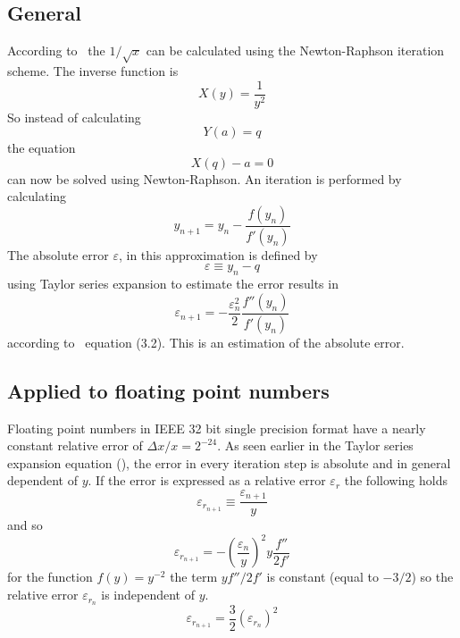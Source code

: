 \subsection{General}
According to~\cite{Bekker87} the $1/\sqrt{x}$ can be calculated using
the Newton-Raphson iteration scheme. The inverse function is
\begin{equation}
X(y) = \frac{1}{y^{2}}
\end{equation}
So instead of calculating
\begin{equation}
Y(a) = q
\end{equation}
the equation
\begin{equation}
X(q) - a = 0
\label{eqn:inversef}
\end{equation}
can now be solved using Newton-Raphson. An iteration is performed by
calculating
\begin{equation}
y_{n+1} = y_{n} - \frac{f(y_{n})}{f'(y_{n})}
\label{eqn:nr}
\end{equation}
The absolute error $\varepsilon$, in this approximation is defined by
\begin{equation}
\varepsilon \equiv y_{n} - q
\end{equation}
using Taylor series expansion to estimate the error results in
\begin{equation}
\varepsilon _{n+1} = - \frac{\varepsilon _{n}^{2}}{2}
                       \frac{ f''(y_{n})}{f'(y_{n})}
\label{eqn:taylor}
\end{equation}
according to~\cite{Bekker87} equation (3.2). This is an estimation of the
absolute error.

\subsection{Applied to floating point numbers}
Floating point numbers in IEEE 32 bit single precision format have a nearly
constant relative error of $\Delta x / x = 2^{-24}$. As seen earlier in the
Taylor series expansion equation (), the error in every
iteration step is absolute and in general dependent of $y$. If the error is
expressed as a relative error $\varepsilon_{r}$ the following holds
\begin{equation}
\varepsilon _{{r}_{n+1}} \equiv \frac{\varepsilon_{n+1}}{y}
\end{equation}
and so
\begin{equation}
\varepsilon _{{r}_{n+1}} =
- ( \frac{\varepsilon _{n}}{y} )^{2} y \frac{ f''}{2f'}
\end{equation}
for the function $f(y) = y^{-2}$ the term $y f''/2f'$ is constant (equal
to $-3/2$) so the relative error $\varepsilon _{r_{n}}$ is independent of $y$.
\begin{equation}
\varepsilon _{{r}_{n+1}} =
\frac{3}{2} (\varepsilon_{r_{n}})^{2}
\label{eqn:epsr}
\end{equation}


